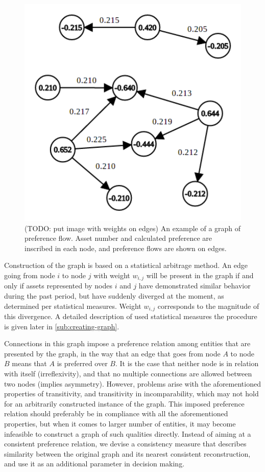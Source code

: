 \documentclass[lmodern, utf8, diplomski]{fer}
\begin{document}
  \begin{figure}[h]
    \centering
    \includegraphics[width=\columnwidth]{graphics/graph.pdf}
    \caption{(TODO: put image with weights on edges) An example of a graph of preference flow. Asset number and calculated preference are inscribed in each node, and preference flows are shown on edges.}
    \label{fig:graph}
  \end{figure}
  
  Construction of the graph is based on a statistical arbitrage method.
  An edge going from node $i$ to node $j$ with weight $w_{i,j}$ will be present in the graph if and only if assets represented by nodes $i$ and $j$ have demonstrated similar behavior during the past period, but have suddenly diverged at the moment, as determined per statistical measures.
  Weight $w_{i,j}$ corresponds to the magnitude of this divergence.  
  A detailed description of used statistical measures the procedure is given later in \ref{sub:creating-graph}.
  
  Connections in this graph impose a preference relation among entities that are presented by the graph, in the way that an edge that goes from node $A$ to node $B$ means that $A$ is preferred over $B$.
  It is the case that neither node is in relation with itself (irreflexivity), and that no multiple connections are allowed between two nodes (implies asymmetry).
  However, problems arise with the aforementioned properties of transitivity, and transitivity in incomparability, which may not hold for an arbitrarily constructed instance of the graph.
  This imposed preference relation should preferably be in compliance with all the aforementioned properties, but when it comes to larger number of entities, it may become infeasible to construct a graph of such qualities directly.
  Instead of aiming at a consistent preference relation, we devise a consistency measure that describes similarity between the original graph and its nearest consistent reconstruction, and use it as an additional parameter in decision making.
  
\end{document}
